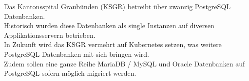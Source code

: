 \documentclass{ksgr_styles}
\begin{document}

    \maketitle
    \clearpage
    \begin{managementsummary}
        \begin{flushleft}
            Das Kantonsspital Graubünden (KSGR) betreibt über zwanzig PostgreSQL Datenbanken.\\
            Historisch wurden diese Datenbanken als single Instanzen auf diversen Applikationsservern betrieben.\\
            In Zukunft wird das KSGR vermehrt auf Kubernetes setzen, was weitere PostgreSQL Datenbanken mit sich bringen wird.\\
            Zudem sollen eine ganze Reihe MariaDB / MySQL und Oracle Datenbanken auf PostgreSQL sofern möglich migriert werden.
        \end{flushleft}
        \begin{flushleft}

\end{flushleft}
\end{managementsummary}
\end{document}
